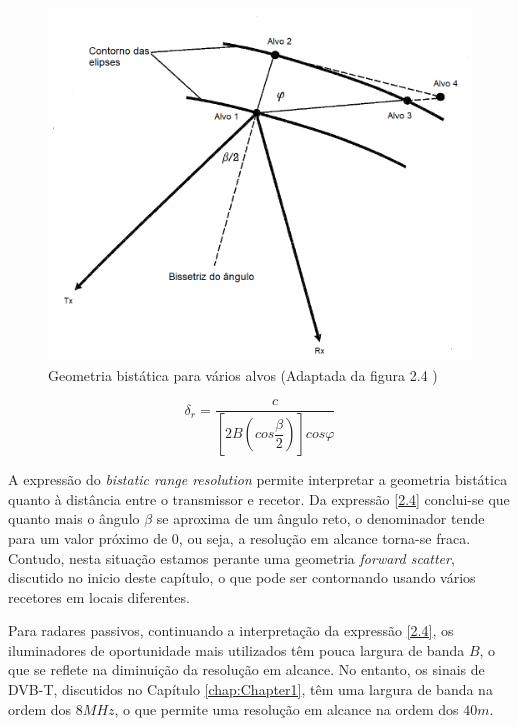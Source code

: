 \begin{figure}[h]
\centering
\includegraphics[scale=0.5]{chapters/ch2/assets/geom_varios_alvos}
\caption[Geometria bistática para vários alvos]{Geometria bistática para vários alvos (Adaptada da figura 2.4 \cite{Griffiths2017})}
\label{fig:geom_varios_alvos}
\end{figure}


\begin{equation} \label{2.4}
\delta_{r}=\dfrac{c}{\left[ 2B\left( cos\dfrac{\beta}{2}\right)\right] cos\varphi}
\end{equation}


A expressão do \textit{bistatic range resolution} permite interpretar a geometria bistática quanto à distância entre o transmissor e recetor. Da expressão \ref{2.4} conclui-se que quanto mais o ângulo $\beta$ se aproxima de um ângulo reto, o denominador tende para um valor próximo de 0, ou seja, a resolução em alcance torna-se fraca. Contudo, nesta situação estamos perante uma geometria \textit{forward scatter}, discutido no inicio deste capítulo, o que pode ser contornando usando vários recetores em locais diferentes.\par 
Para radares passivos, continuando a interpretação da expressão \ref{2.4}, os iluminadores de oportunidade mais utilizados têm pouca largura de banda $B$, o que se reflete na diminuição da resolução em alcance. No entanto, os sinais de \gls{DVB-T}, discutidos no Capítulo \ref{chap:Chapter1}, têm uma largura de banda na ordem dos $8 MHz$, o que permite uma resolução em alcance na ordem dos $40m$.

